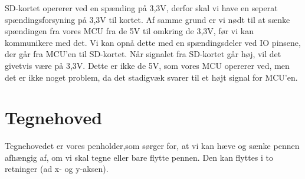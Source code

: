 SD-kortet opererer ved en spænding på 3,3V, derfor skal vi have en
seperat spændingsforsyning på 3,3V til kortet. Af samme grund er vi
nødt til at sænke spændingen fra vores MCU fra de 5V til omkring de
3,3V, før vi kan kommunikere med det. Vi kan opnå dette med en
spændingsdeler ved IO pinsene, der går fra MCU'en til SD-kortet. Når
signalet fra SD-kortet går høj, vil det givetvis være på 3,3V. Dette
er ikke de 5V, som vores MCU opererer ved, men det er ikke noget
problem, da det stadigvæk svarer til et højt signal for MCU'en.


\section{Tegnehoved}
\label{sc:d-tegnehoved}
Tegnehovedet er vores penholder,som sørger for, at vi kan hæve og sænke
pennen afhængig af, om vi skal tegne eller bare flytte pennen. Den kan
flyttes i to retninger (ad x- og y-aksen).




